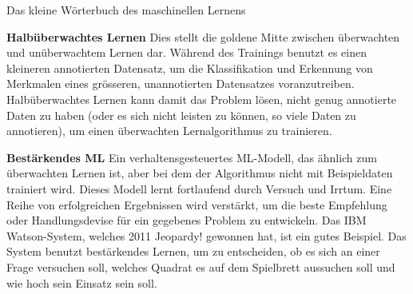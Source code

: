 \begin{lpu}{Das kleine Wörterbuch des maschinellen Lernens}
\begin{artikelbox}
\textbf{Halbüberwachtes Lernen}
Dies stellt die goldene Mitte zwischen überwachten und unüberwachtem Lernen dar. Während des Trainings benutzt es einen kleineren annotierten Datensatz, um die Klassifikation und Erkennung von Merkmalen eines grösseren, unannotierten Datensatzes voranzutreiben. Halbüberwachtes Lernen kann damit das Problem lösen, nicht genug annotierte Daten zu haben (oder es sich nicht leisten zu können, so viele Daten zu annotieren), um einen überwachten Lernalgorithmus zu trainieren.

\textbf{Bestärkendes ML}
Ein verhaltensgesteuertes ML-Modell, das ähnlich zum überwachten Lernen ist, aber bei dem der Algorithmus nicht mit Beispieldaten trainiert wird. Dieses Modell lernt fortlaufend durch Versuch und Irrtum. Eine Reihe von erfolgreichen Ergebnissen wird verstärkt, um die beste Empfehlung oder Handlungsdevise für ein gegebenes Problem zu entwickeln.
Das IBM Watson-System, welches 2011 Jeopardy! gewonnen hat, ist ein gutes Beispiel. Das System benutzt bestärkendes Lernen, um zu entscheiden, ob es sich an einer Frage versuchen soll, welches Quadrat es auf dem Spielbrett aussuchen soll und wie hoch sein Einsatz sein soll.


\end{artikelbox}
\end{lpu}
